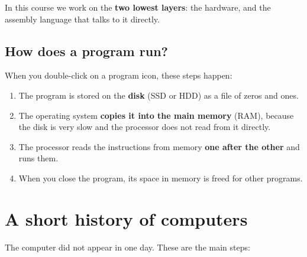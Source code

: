 \begin{center}
\end{center}
In this course we work on the \textbf{two lowest layers}: the hardware, and the assembly language
that talks to it directly.

\subsection{How does a program run?}
When you double-click on a program icon, these steps happen:
\begin{enumerate}
    \item The program is stored on the \textbf{disk} (SSD or HDD) as a file of zeros and ones.
    \item The operating system \textbf{copies it into the main memory} (RAM), because the disk is very slow
          and the processor does not read from it directly.
    \item The processor reads the instructions from memory \textbf{one after the other} and runs them.
    \item When you close the program, its space in memory is freed for other programs.
\end{enumerate}

\section{A short history of computers}

The computer did not appear in one day. These are the main steps:

